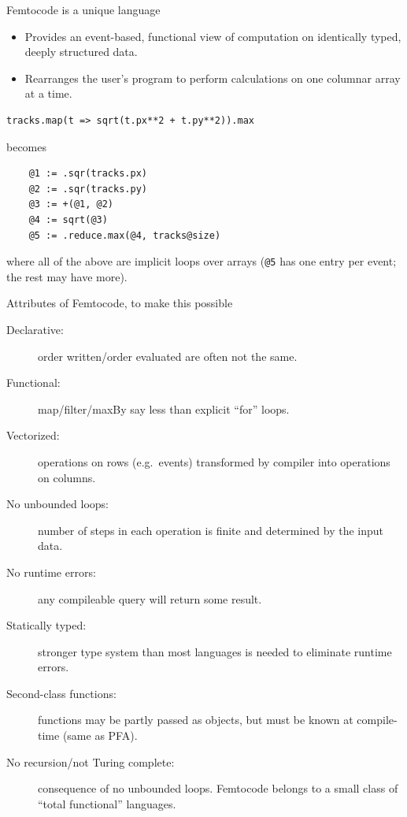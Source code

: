\documentclass{beamer}
\begin{document}
\begin{frame}[fragile]{Femtocode is a unique language}
\vspace{0.25 cm}
\begin{itemize}
\item Provides an event-based, functional view of computation on identically typed, deeply structured data.
\item Rearranges the user's program to perform calculations on one columnar array at a time.
\end{itemize}

\begin{verbatim}
tracks.map(t => sqrt(t.px**2 + t.py**2)).max
\end{verbatim}

becomes

\vspace{-0.25 cm}
\begin{verbatim}
    @1 := .sqr(tracks.px)
    @2 := .sqr(tracks.py)
    @3 := +(@1, @2)
    @4 := sqrt(@3)
    @5 := .reduce.max(@4, tracks@size)
\end{verbatim}

where all of the above are implicit loops over arrays ({\tt @5} has one entry per event; the rest may have more).
\end{frame}

\begin{frame}{Attributes of Femtocode, to make this possible}
\vspace{0.25 cm}
\begin{description}
\item[Declarative:] order written/order evaluated are often not the same.
\item[Functional:] map/filter/maxBy say less than explicit ``for'' loops.
\item[Vectorized:] operations on rows (e.g.\ events) transformed by compiler into operations on columns.

\item[No unbounded loops:] number of steps in each operation is finite and determined by the input data.

\item[No runtime errors:] any compileable query will return some result.

\item[Statically typed:] stronger type system than most languages is needed to eliminate runtime errors.

\item[Second-class functions:] functions may be partly passed as objects, but must be known at compile-time (same as PFA).

\item[No recursion/not Turing complete:] consequence of no unbounded loops. Femtocode belongs to a small class of ``total functional'' languages.
\end{description}
\end{frame}
\end{document}
